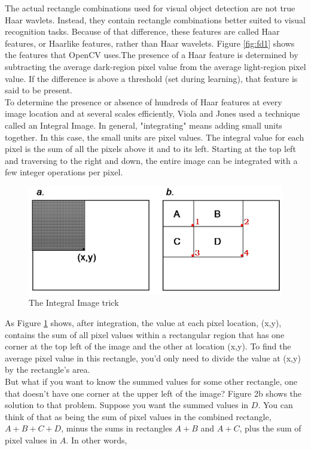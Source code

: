 \documentclass[12pt]{article}			%
\begin{document}
The actual rectangle combinations used for visual object detection are not true Haar wavlets. Instead, they contain rectangle combinations better suited to visual recognition tasks. Because of that difference, these features are called Haar features, or Haarlike features, rather than Haar wavelets. Figure \ref{fig:fd1} shows the features that OpenCV uses.The presence of a Haar feature is determined by subtracting the average dark-region pixel value from the average light-region pixel value. If the difference is above a threshold (set during learning), that feature is said to be present.\\
To determine the presence or absence of hundreds of Haar features at every image location and at several scales efficiently, Viola and Jones used a technique called an Integral Image. In general, "integrating" means adding small units together. In this case, the small units are pixel values. The integral value for each pixel is the sum of all the pixels above it and to its left. Starting at the top left and traversing to the right and down, the entire image can be integrated with a few integer operations per pixel.\\
\begin{figure}[h!]
	\centering
	\includegraphics[scale=0.3]{img/fd3.png}
	\caption{The Integral Image trick}
	\label{fig:fd2}
\end{figure}
As Figure \ref{fig:fd2} shows, after integration, the value at each pixel location, (x,y), contains the sum of all pixel values within a rectangular region that has one corner at the top left of the image and the other at location (x,y). To find the average pixel value in this rectangle, you'd only need to divide the value at (x,y) by the rectangle's area.\\
But what if you want to know the summed values for some other rectangle, one that doesn't have one corner at the upper left of the image? Figure 2b shows the solution to that problem. Suppose you want the summed values in $D$. You can think of that as being the sum of pixel values in the combined rectangle, $A+B+C+D$, minus the sums in rectangles $A+B$ and $A+C$, plus the sum of pixel values in $A$. In other words,
\end{document}
